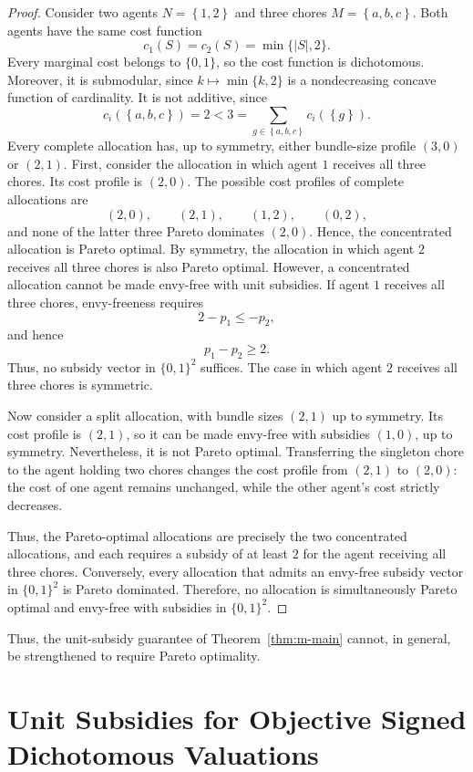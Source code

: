 \documentclass[sigconf,anonymous]{aamas}
\newcommand{\agents}{N}
\newcommand{\items}{M}
\newcommand{\cost}{c}
\newcommand{\set}[1]{\left\{#1\right\}}
\newcommand{\abs}[1]{\left\lvert#1\right\rvert}
\theoremstyle{acmplain}
\theoremstyle{acmdefinition}
\theoremstyle{acmplain}
\begin{document}
\begin{proof}
Consider two agents $\agents=\set{1,2}$ and three chores $\items=\set{a,b,c}$. Both agents have the same cost function
\[ \cost_1(S)=\cost_2(S)=\min\{\abs S,2\}.
\]
Every marginal cost belongs to $\{0,1\}$, so the cost function is dichotomous. Moreover, it is submodular, since $k\mapsto\min\{k,2\}$ is a nondecreasing concave function of cardinality. It is not additive, since
\[\cost_i(\set{a,b,c})=2<3
    =\sum_{g\in\set{a,b,c}}\cost_i(\set g).
\]
Every complete allocation has, up to symmetry, either bundle-size profile $(3,0)$ or $(2,1)$. First, consider the allocation in which agent $1$ receives all three chores. Its cost profile is $(2,0)$. The possible cost profiles of complete allocations are
\[(2,0),\qquad (2,1),\qquad (1,2),\qquad (0,2),
\]
and none of the latter three Pareto dominates $(2,0)$. Hence, the concentrated allocation is Pareto optimal. By symmetry, the allocation in which agent $2$ receives all three chores is also Pareto optimal. However, a concentrated allocation cannot be made envy-free with unit subsidies. If agent $1$ receives all three chores, envy-freeness requires
\[
    2-p_1\leq -p_2,
\] and hence
\[
    p_1-p_2\geq 2.
\]
Thus, no subsidy vector in $\{0,1\}^2$ suffices. The case in which agent $2$ receives all three chores is symmetric.

Now consider a split allocation, with bundle sizes $(2,1)$ up to symmetry. Its cost profile is $(2,1)$, so it can be made envy-free with subsidies $(1,0)$, up to symmetry. Nevertheless, it is not Pareto optimal. Transferring the singleton chore to the agent holding two chores changes the cost profile from $(2,1)$ to $(2,0)$: the cost of one agent remains unchanged, while the other agent's cost strictly decreases.

Thus, the Pareto-optimal allocations are precisely the two concentrated allocations, and each requires a subsidy of at least $2$ for the agent receiving all three chores. Conversely, every allocation that admits an envy-free subsidy vector in $\{0,1\}^2$ is Pareto dominated. Therefore, no allocation is simultaneously Pareto optimal and envy-free with subsidies in $\{0,1\}^2$.
\end{proof}

Thus, the unit-subsidy guarantee of Theorem~\ref{thm:m-main} cannot, in general, be strengthened to require Pareto optimality.

\section{Unit Subsidies for Objective Signed Dichotomous Valuations}
\label{sec:objective-mixed}
\end{document}
